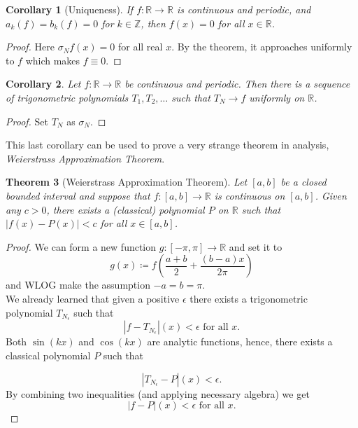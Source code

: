 \documentclass[12pt]{amsart}
\newtheorem{theorem}{Theorem}[section]
\newtheorem{corollary}[theorem]{Corollary}
\theoremstyle{definition}
\newcommand{\RR}{{\mathbb R}} %
\begin{document}
\begin{corollary}[Uniqueness] \footnotemark{}




If $f : \mathbb{R} \to \mathbb{R}$ is continuous and periodic, and $a_k(f) = b_k(f) = 0$ for $k \in \mathbb{Z}$, then $f(x) = 0$ for all $x \in \mathbb{R}$.
\end{corollary}


\begin{proof}
    Here $\sigma_Nf(x) = 0$ for all real $x$. By the theorem, it approaches uniformly to \(f\) which makes $f \equiv 0$.
\end{proof}


\begin{corollary}
    Let $f : \mathbb{R} \rightarrow \mathbb{R}$ be continuous and periodic. Then there is a sequence of trigonometric polynomials $T_1, T_2, \ldots$ such that $T_N \rightarrow f$ uniformly on $\mathbb{R}$.
\end{corollary}


\begin{proof}
    Set $T_N$ as $\sigma_N$.
\end{proof}


This last corollary can be used to prove a very strange theorem in analysis, \textit{Weierstrass Approximation Theorem}.


\begin{theorem}[Weierstrass Approximation Theorem] Let $[a, b]$ be a closed bounded interval and suppose that $f : [a, b] \rightarrow \mathbb{R}$ is continuous on $[a, b]$. Given any $c > 0$, there exists a (classical) polynomial $P$ on $\mathbb{R}$ such that $|f(x) - P(x)| < c$ for all $x \in [a, b]$.
\end{theorem}


\begin{proof} We can form a new function $g: [-\pi,\pi] \to \RR$ and set it to 
\[
g(x) \coloneqq f\left(\frac{a+b}{2} + \frac{(b-a)x}{2\pi}\right)
\]
and WLOG make the assumption $-a = b = \pi$.\\

    We already learned that given a positive $\epsilon$ there exists a trigonometric polynomial $T_{N_\epsilon}$ such that
    \[
    |f - T_{N_\epsilon}|(x) < \epsilon \text{ for all $x$.}
    \]
    Both $\sin(kx)$ and $\cos(kx)$ are analytic functions, hence, there exists a classical polynomial $P$ such that


   
    \[
    |T_{N_\epsilon} - P|(x) < \epsilon.
    \]
    By combining two inequalities (and applying necessary algebra) we get
    \[
    |f - P|(x) < \epsilon \text{ for all $x$.}
    \]
\end{proof}
\end{document}
